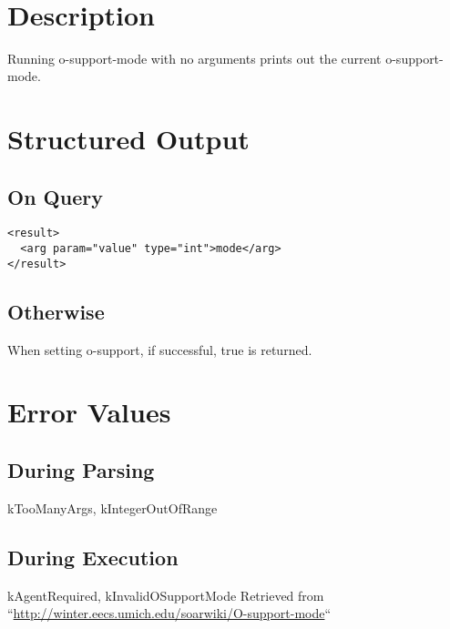 \documentclass[10pt]{article}
\begin{document}
 \\ 

\section*{ Description }


 Running o-support-mode with no arguments prints out the current o-support-mode. 
\section*{ Structured Output }
\subsection*{ On Query }
\begin{verbatim}
<result>
  <arg param="value" type="int">mode</arg>
</result>

\end{verbatim}
\subsection*{ Otherwise }


 When setting o-support, if successful, true is returned. 
\section*{ Error Values }
\subsection*{ During Parsing }


 kTooManyArgs, kIntegerOutOfRange
\subsection*{ During Execution }


 kAgentRequired, kInvalidOSupportMode Retrieved from ``\url{http://winter.eecs.umich.edu/soarwiki/O-support-mode}``
\end{document}
